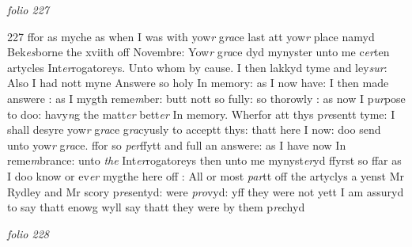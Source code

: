 \documentclass[12pt, a4paper]{book}
\begin{document}
\textit{folio 227}



{\color{Mahogany}227} ffor as myche as when I was with yow\textit{r} g\textit{ra}ce last att yow\textit{r} place namyd Bek\textit{es}borne the xviith off Novembre: Yow\textit{r} g\textit{ra}ce dyd mynyster unto me c\textit{er}ten artycles Int\textit{er}rogatoreys. Unto whom by cause. I then lakkyd tyme and ley\textit{sur}: Also I had nott myne Answere so holy In memory: as I now have:  I then made answere : as I mygth reme\textit{m}ber: butt nott  so fully: so thorowly : as now I p\textit{ur}pose to doo: havy\textit{n}g the matt\textit{er} bett\textit{er} In memory. Wherfor att thys p\textit{re}sentt tyme: I shall desyre yow\textit{r} g\textit{ra}ce g\textit{ra}cyusly to acceptt thys: thatt here I now: doo send unto yow\textit{r} g\textit{ra}ce. ffor so \textit{per}ffytt and full an answere: as I have now In reme\textit{m}brance: unto \textit{the }Int\textit{er}rogatoreys then unto me mynyst\textit{er}yd ffyrst so ffar as I doo know or ev\textit{er} mygthe here off : All  or most \textit{par}tt off the artyclys a yenst Mr Rydley and Mr  scory p\textit{re}sentyd: were \textit{pro}vyd: yff they were not yett I am assuryd
			 to say thatt enowg wyll say thatt they were by them
			 p\textit{re}chyd

\dotfill
					

\textit{folio 228}
\end{document}
